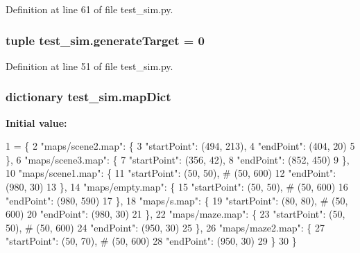 Definition at line 61 of file test\-\_\-sim.\-py.

\hypertarget{namespacetest__sim_a62047015d5d3114a87c78d8987e7a92e}{
\subsubsection[{generate\-Target}]{\setlength{\rightskip}{0pt plus 5cm}tuple test\-\_\-sim.\-generate\-Target = 0}}\label{namespacetest__sim_a62047015d5d3114a87c78d8987e7a92e}


Definition at line 51 of file test\-\_\-sim.\-py.

\hypertarget{namespacetest__sim_a7550c4b395516fd2fa13ebfd927c9908}{
\subsubsection[{map\-Dict}]{\setlength{\rightskip}{0pt plus 5cm}dictionary test\-\_\-sim.\-map\-Dict}}\label{namespacetest__sim_a7550c4b395516fd2fa13ebfd927c9908}
{\bfseries Initial value\-:}
\begin{DoxyCode}
1 = \{
2         \textcolor{stringliteral}{"maps/scene2.map"}: \{
3             \textcolor{stringliteral}{"startPoint"}: (494, 213),
4             \textcolor{stringliteral}{"endPoint"}: (404, 20)
5         \},
6         \textcolor{stringliteral}{"maps/scene3.map"}: \{
7             \textcolor{stringliteral}{"startPoint"}: (356, 42),
8             \textcolor{stringliteral}{"endPoint"}: (852, 450)
9         \},
10         \textcolor{stringliteral}{"maps/scene1.map"}: \{
11             \textcolor{stringliteral}{"startPoint"}: (50, 50),  \textcolor{comment}{# (50, 600)}
12             \textcolor{stringliteral}{"endPoint"}: (980, 30)
13         \},
14         \textcolor{stringliteral}{"maps/empty.map"}: \{
15             \textcolor{stringliteral}{"startPoint"}: (50, 50),  \textcolor{comment}{# (50, 600)}
16             \textcolor{stringliteral}{"endPoint"}: (980, 590)
17         \},
18         \textcolor{stringliteral}{"maps/s.map"}: \{
19             \textcolor{stringliteral}{"startPoint"}: (80, 80),  \textcolor{comment}{# (50, 600)}
20             \textcolor{stringliteral}{"endPoint"}: (980, 30)
21         \},
22         \textcolor{stringliteral}{"maps/maze.map"}: \{
23             \textcolor{stringliteral}{"startPoint"}: (50, 50),  \textcolor{comment}{# (50, 600)}
24             \textcolor{stringliteral}{"endPoint"}: (950, 30)
25         \},
26         \textcolor{stringliteral}{"maps/maze2.map"}: \{
27             \textcolor{stringliteral}{"startPoint"}: (50, 70),  \textcolor{comment}{# (50, 600)}
28             \textcolor{stringliteral}{"endPoint"}: (950, 30)
29         \}
30     \}
\end{DoxyCode}


